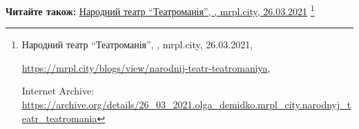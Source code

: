  
 
 
 
 

\def\pubIA{https://archive.org/details/26_03_2021.olga_demidko.mrpl_city.narodnyj_teatr_teatromania}
\def\pubTitle{Народний театр \enquote{Театроманія}}
\def\pubDate{26.03.2021}
\def\pubOrigin{https://mrpl.city/blogs/view/narodnij-teatr-teatromaniya}
\def\pubAuthor{\pubAuthorDemidko}

\textbf{Читайте також:} \href{\pubIA}{%
\pubTitle, \pubAuthor, mrpl.city, \pubDate}%
\footnote{\pubTitle, \pubAuthor, mrpl.city, \pubDate, \par\url{\pubOrigin}, \par Internet Archive: \url{\pubIA}}
